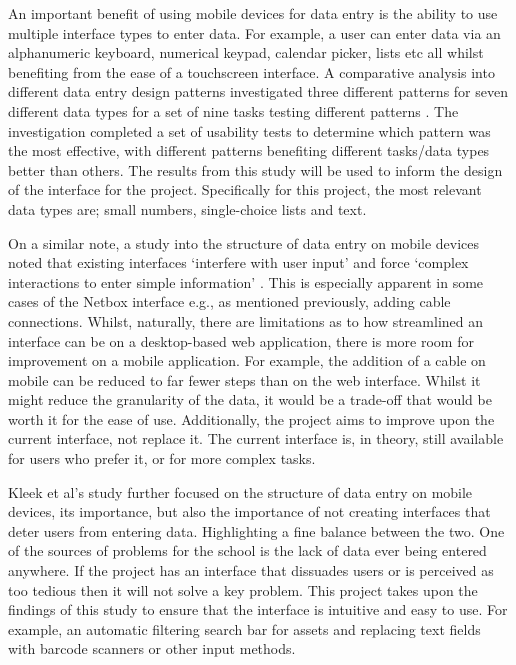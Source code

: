 \documentclass [11pt,a4paper]{article}
\begin{document}
An important benefit of using mobile devices for data entry is the ability to use multiple interface types to enter data. For example, a user can enter data via an alphanumeric keyboard, numerical keypad, calendar picker, lists etc all whilst benefiting from the ease of a touchscreen interface. A comparative analysis into different data entry design patterns investigated three different patterns for seven different data types for a set of nine tasks testing different patterns \cite{myka2019comparative}. The investigation completed a set of usability tests to determine which pattern was the most effective, with different patterns benefiting different tasks/data types better than others. The results from this study will be used to inform the design of the interface for the project. Specifically for this project, the most relevant data types are; small numbers, single-choice lists and text.

On a similar note, a study into the structure of data entry on mobile devices noted that existing interfaces `interfere with user input' and force `complex interactions to enter simple information' \cite{van2007gui}. This is especially apparent in some cases of the Netbox interface e.g., as mentioned previously, adding cable connections. Whilst, naturally, there are limitations as to how streamlined an interface can be on a desktop-based web application, there is more room for improvement on a mobile application. For example, the addition of a cable on mobile can be reduced to far fewer steps than on the web interface. Whilst it might reduce the granularity of the data, it would be a trade-off that would be worth it for the ease of use. Additionally, the project aims to improve upon the current interface, not replace it. The current interface is, in theory, still available for users who prefer it, or for more complex tasks.

Kleek et al's \cite{van2007gui} study further focused on the structure of data entry on mobile devices, its importance, but also the importance of not creating interfaces that deter users from entering data. Highlighting a fine balance between the two. One of the sources of problems for the school is the lack of data ever being entered anywhere. If the project has an interface that dissuades users or is perceived as too tedious then it will not solve a key problem. This project takes upon the findings of this study to ensure that the interface is intuitive and easy to use. For example, an automatic filtering search bar for assets and replacing text fields with barcode scanners or other input methods.
\end{document}
